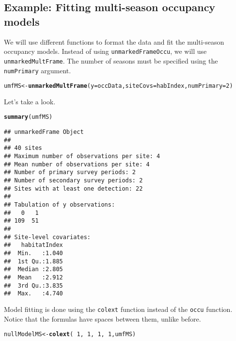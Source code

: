 \documentclass[12pt]{article}\usepackage[]{graphicx}\usepackage[]{color}
\makeatletter
\newcommand{\hlnum}[1]{\textcolor[rgb]{0.686,0.059,0.569}{#1}}%
\newcommand{\hlopt}[1]{\textcolor[rgb]{0,0,0}{#1}}%
\newcommand{\hlstd}[1]{\textcolor[rgb]{0.345,0.345,0.345}{#1}}%
\newcommand{\hlkwb}[1]{\textcolor[rgb]{0.69,0.353,0.396}{#1}}%
\newcommand{\hlkwc}[1]{\textcolor[rgb]{0.333,0.667,0.333}{#1}}%
\newcommand{\hlkwd}[1]{\textcolor[rgb]{0.737,0.353,0.396}{\textbf{#1}}}%
\newenvironment{kframe}{%
 \def\at@end@of@kframe{}%
 \ifinner\ifhmode%
  \def\at@end@of@kframe{\end{minipage}}%
  \begin{minipage}{\columnwidth}%
 \fi\fi%
 \def\FrameCommand##1{\hskip\@totalleftmargin \hskip-\fboxsep
 \colorbox{shadecolor}{##1}\hskip-\fboxsep
     \hskip-\linewidth \hskip-\@totalleftmargin \hskip\columnwidth}%
 \MakeFramed {\advance\hsize-\width
   \@totalleftmargin\z@ \linewidth\hsize
   \@setminipage}}%
 {\par\unskip\endMakeFramed%
 \at@end@of@kframe}
\newenvironment{knitrout}{}{} %
\makeatother
\begin{document}
\subsection*{Example: Fitting multi-season occupancy models}


We will use different functions to format the data and fit the
multi-season occupancy models. Instead of using
\texttt{unmarkedFrameOccu}, we will use
\texttt{unmarkedMultFrame}. The number of seasons must be specified
using the \texttt{numPrimary} argument.


\begin{knitrout}
\color{fgcolor}\begin{kframe}
\begin{alltt}
\hlstd{umfMS} \hlkwb{<-} \hlkwd{unmarkedMultFrame}\hlstd{(}\hlkwc{y}\hlstd{=occData,} \hlkwc{siteCovs}\hlstd{=habIndex,} \hlkwc{numPrimary}\hlstd{=}\hlnum{2}\hlstd{)}
\end{alltt}
\end{kframe}
\end{knitrout}

Let's take a look.

\begin{knitrout}
\color{fgcolor}\begin{kframe}
\begin{alltt}
\hlkwd{summary}\hlstd{(umfMS)}
\end{alltt}
\begin{verbatim}
## unmarkedFrame Object
## 
## 40 sites
## Maximum number of observations per site: 4 
## Mean number of observations per site: 4 
## Number of primary survey periods: 2 
## Number of secondary survey periods: 2 
## Sites with at least one detection: 22 
## 
## Tabulation of y observations:
##   0   1 
## 109  51 
## 
## Site-level covariates:
##   habitatIndex  
##  Min.   :1.040  
##  1st Qu.:1.885  
##  Median :2.805  
##  Mean   :2.912  
##  3rd Qu.:3.835  
##  Max.   :4.740
\end{verbatim}
\end{kframe}
\end{knitrout}

Model fitting is done using the \texttt{colext} function instead of
the \texttt{occu} function. Notice that the formulas have spaces
between them, unlike before.


\begin{knitrout}
\color{fgcolor}\begin{kframe}
\begin{alltt}
\hlstd{nullModelMS} \hlkwb{<-} \hlkwd{colext}\hlstd{(}\hlopt{~}\hlnum{1}\hlstd{,} \hlopt{~}\hlnum{1}\hlstd{,} \hlopt{~}\hlnum{1}\hlstd{,} \hlopt{~}\hlnum{1}\hlstd{, umfMS)}
\end{alltt}
\end{kframe}
\end{knitrout}
\end{document}
